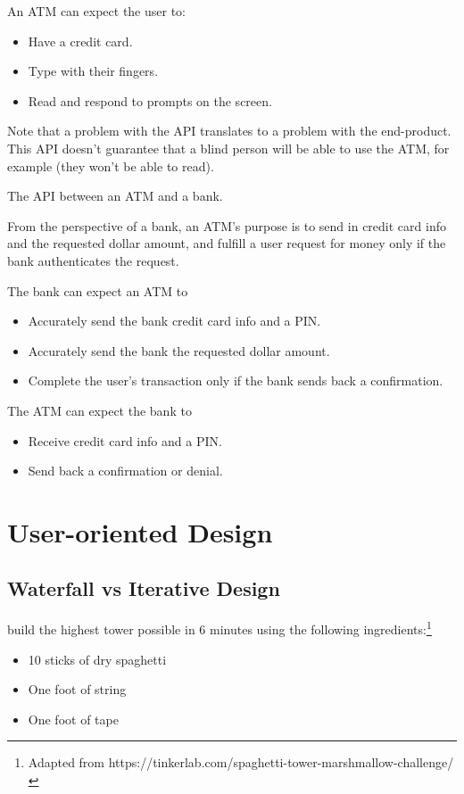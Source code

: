An ATM can expect the user to:
\begin{itemize}
	\item Have a credit card.
	\item Type with their fingers.
	\item Read and respond to prompts on the screen.
\end{itemize}

Note that a problem with the API translates to a problem with the end-product. This API doesn't guarantee that a blind person will be able to use the ATM, for example (they won't be able to read). 

\begin{example}
The API between an ATM and a bank.
\end{example}

From the perspective of a bank, an ATM's purpose is to send in credit card info and the requested dollar amount, and fulfill a user request for money only if the bank authenticates the request. 

The bank can expect an ATM to
\begin{itemize}
	\item Accurately send the bank credit card info and a PIN.
	\item Accurately send the bank the requested dollar amount.
	\item Complete the user's transaction only if the bank sends back a confirmation.
\end{itemize}

The ATM can expect the bank to
\begin{itemize}
	\item Receive credit card info and a PIN.
	\item Send back a confirmation or denial.
\end{itemize}

\section{User-oriented Design}

\subsection{Waterfall vs Iterative Design}

\begin{example}
build the highest tower possible in 6 minutes using the following ingredients:\footnote{Adapted from https://tinkerlab.com/spaghetti-tower-marshmallow-challenge/}
\begin{itemize}
	\item 10 sticks of dry spaghetti
	\item One foot of string
	\item One foot of tape
\end{itemize}
\end{example}

